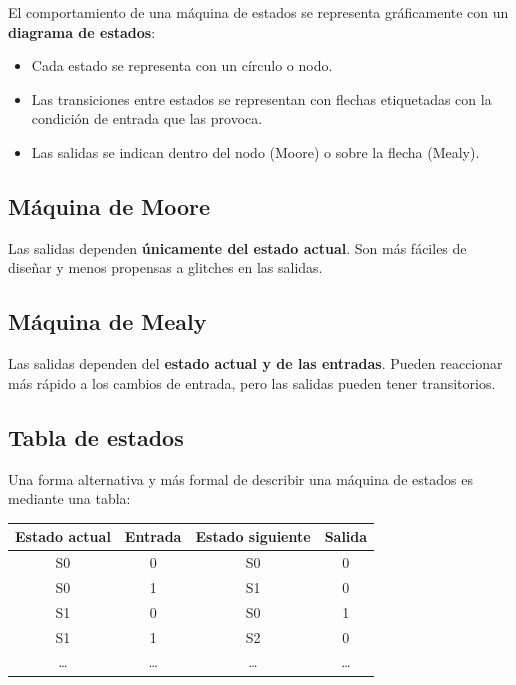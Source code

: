 El comportamiento de una máquina de estados se representa gráficamente con un \textbf{diagrama de estados}:

\begin{itemize}
    \item Cada estado se representa con un círculo o nodo.
    \item Las transiciones entre estados se representan con flechas etiquetadas con la condición de entrada que las provoca.
    \item Las salidas se indican dentro del nodo (Moore) o sobre la flecha (Mealy).
\end{itemize}


\subsection{Máquina de Moore}

Las salidas dependen \textbf{únicamente del estado actual}. Son más fáciles de diseñar y menos propensas a glitches en las salidas.

\subsection{Máquina de Mealy}

Las salidas dependen del \textbf{estado actual y de las entradas}. Pueden reaccionar más rápido a los cambios de entrada, pero las salidas pueden tener transitorios.

\subsection{Tabla de estados}

Una forma alternativa y más formal de describir una máquina de estados es mediante una tabla:

\begin{table}[H]
\centering
\begin{tabular}{cccc}
\toprule
Estado actual & Entrada & Estado siguiente & Salida \\
\midrule
S0 & 0 & S0 & 0 \\
S0 & 1 & S1 & 0 \\
S1 & 0 & S0 & 1 \\
S1 & 1 & S2 & 0 \\
\ldots & \ldots & \ldots & \ldots \\
\bottomrule
\end{tabular}
\end{table}

